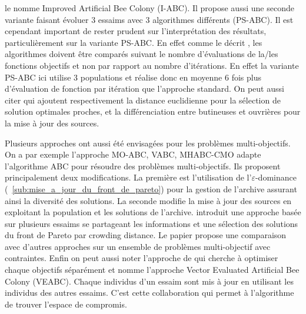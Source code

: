 le nomme Improved Artificial Bee Colony (I-ABC).
Il propose aussi une seconde variante faisant évoluer 3 essaims avec 3 algorithmes différents (PS-ABC). Il est cependant
important de rester prudent sur l’interprétation des résultats, particulièrement sur la variante PS-ABC. En effet comme
le décrit \cite{Mernik2015115}, les algorithmes doivent être comparés suivant le nombre d’évaluations de la/les fonctions
objectifs et non par rapport au nombre d’itérations. En effet la variante PS-ABC ici utilise 3 populations et réalise donc
en moyenne 6 fois plus d’évaluation de fonction par itération que l’approche standard.
On peut aussi citer \cite{Aderhold2010283,Karaboga2014227} qui ajoutent respectivement la distance euclidienne pour la sélection
de solution optimales proches, et la différenciation entre butineuses et ouvrières pour la mise à jour des sources.

Plusieurs approches ont aussi été envisagées pour les problèmes multi-objectifs. On a par exemple l’approche MO-ABC, VABC, MHABC-CMO
\cite{Hedayatzadeh2010, Akbari201239} adapte l’algorithme ABC pour résoudre des problèmes multi-objectifs. Ils proposent
principalement deux modifications. La première est l’utilisation de l’$\varepsilon$-dominance
(~\autoref{sub:mise_a_jour_du_front_de_pareto})
pour la gestion de l’archive assurant ainsi la diversité des solutions. La seconde modifie la mise à jour des sources en
exploitant la population et les solutions de l’archive.
\cite{Zhang20121} introduit une approche basée sur plusieurs essaims se partageant les informations et une sélection
des solutions du front de Pareto par crowding distance. Le papier propose une comparaison avec d’autres approches sur un ensemble de
problèmes multi-objectif avec contraintes.
Enfin on peut aussi noter l’approche de \cite{Omkar2011489} qui cherche à optimiser chaque objectifs séparément et nomme l’approche
Vector Evaluated Artificial Bee Colony (VEABC). Chaque individus d’un
essaim sont mis à jour en utilisant les individus des autres essaims. C’est cette collaboration qui permet à l’algorithme
de trouver l’espace de compromis.


